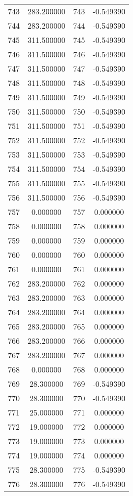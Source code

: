 \documentclass[12pt]{article}
\begin{document}
\begin{longtable}{@{}cccc@{}}
743 & 283.200000 & 743 & -0.549390 \\
744 & 283.200000 & 744 & -0.549390 \\
745 & 311.500000 & 745 & -0.549390 \\
746 & 311.500000 & 746 & -0.549390 \\
747 & 311.500000 & 747 & -0.549390 \\
748 & 311.500000 & 748 & -0.549390 \\
749 & 311.500000 & 749 & -0.549390 \\
750 & 311.500000 & 750 & -0.549390 \\
751 & 311.500000 & 751 & -0.549390 \\
752 & 311.500000 & 752 & -0.549390 \\
753 & 311.500000 & 753 & -0.549390 \\
754 & 311.500000 & 754 & -0.549390 \\
755 & 311.500000 & 755 & -0.549390 \\
756 & 311.500000 & 756 & -0.549390 \\
757 & 0.000000 & 757 & 0.000000 \\
758 & 0.000000 & 758 & 0.000000 \\
759 & 0.000000 & 759 & 0.000000 \\
760 & 0.000000 & 760 & 0.000000 \\
761 & 0.000000 & 761 & 0.000000 \\
762 & 283.200000 & 762 & 0.000000 \\
763 & 283.200000 & 763 & 0.000000 \\
764 & 283.200000 & 764 & 0.000000 \\
765 & 283.200000 & 765 & 0.000000 \\
766 & 283.200000 & 766 & 0.000000 \\
767 & 283.200000 & 767 & 0.000000 \\
768 & 0.000000 & 768 & 0.000000 \\
769 & 28.300000 & 769 & -0.549390 \\
770 & 28.300000 & 770 & -0.549390 \\
771 & 25.000000 & 771 & 0.000000 \\
772 & 19.000000 & 772 & 0.000000 \\
773 & 19.000000 & 773 & 0.000000 \\
774 & 19.000000 & 774 & 0.000000 \\
775 & 28.300000 & 775 & -0.549390 \\
776 & 28.300000 & 776 & -0.549390 \\

\end{longtable}
\end{document}
